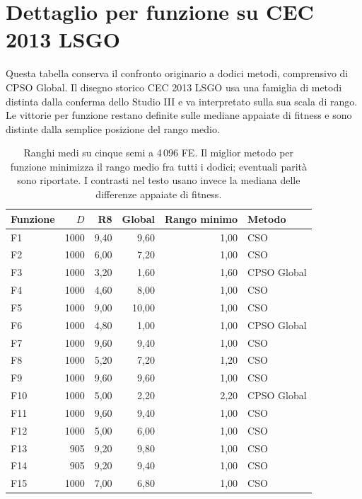 \section{Dettaglio per funzione su CEC 2013 LSGO}\label{app:cec-functions}
Questa tabella conserva il confronto originario a dodici metodi, comprensivo di CPSO Global. Il disegno storico CEC 2013 LSGO usa una famiglia di metodi distinta dalla conferma dello Studio III e va interpretato sulla sua scala di rango. Le vittorie per funzione restano definite sulle mediane appaiate di fitness e sono distinte dalla semplice posizione del rango medio.
\begin{table}[H]\centering\small
\caption{Ranghi medi su cinque semi a 4\,096 FE. Il miglior metodo per funzione minimizza il rango medio fra tutti i dodici; eventuali parità sono riportate. I contrasti nel testo usano invece la mediana delle differenze appaiate di fitness.}
\begin{tabular}{@{}lrrrrl@{}}\toprule
Funzione & $D$ & R8 & Global & Rango minimo & Metodo\\\midrule
F1 & 1000 & 9,40 & 9,60 & 1,00 & CSO\\
F2 & 1000 & 6,00 & 7,20 & 1,00 & CSO\\
F3 & 1000 & 3,20 & 1,60 & 1,60 & CPSO Global\\
F4 & 1000 & 4,60 & 8,00 & 1,00 & CSO\\
F5 & 1000 & 9,00 & 10,00 & 1,00 & CSO\\
F6 & 1000 & 4,80 & 1,00 & 1,00 & CPSO Global\\
F7 & 1000 & 9,60 & 9,40 & 1,00 & CSO\\
F8 & 1000 & 5,20 & 7,20 & 1,20 & CSO\\
F9 & 1000 & 9,60 & 9,60 & 1,00 & CSO\\
F10 & 1000 & 5,00 & 2,20 & 2,20 & CPSO Global\\
F11 & 1000 & 9,60 & 9,40 & 1,00 & CSO\\
F12 & 1000 & 5,00 & 6,00 & 1,00 & CSO\\
F13 & 905 & 9,20 & 9,80 & 1,00 & CSO\\
F14 & 905 & 9,20 & 9,40 & 1,00 & CSO\\
F15 & 1000 & 7,00 & 6,80 & 1,00 & CSO\\
\bottomrule\end{tabular}\end{table}
